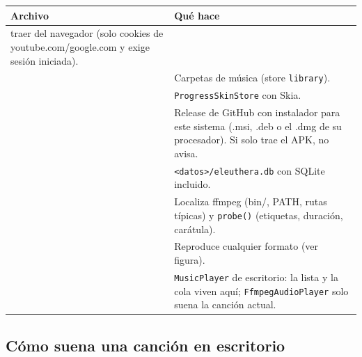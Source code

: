 \documentclass[11pt,a4paper,oneside]{report}
\newcommand{\ruta}[1]{{\small\path{#1}}}
\newcommand{\cod}[1]{\texttt{\small #1}}
\newenvironment{archivos}{%
  \small
  \begin{longtable}{>{\raggedright\arraybackslash}p{5.3cm} >{\raggedright\arraybackslash}p{10.6cm}}
  \toprule
  \textbf{Archivo} & \textbf{Qué hace} \\ \midrule \endhead
  \bottomrule \endfoot
}{\end{longtable}}
\begin{document}
\begin{archivos}
    traer del navegador (solo cookies de youtube.com/google.com y exige sesión iniciada). \\
  \ruta{data/settings/DesktopLibrarySettings.kt} & Carpetas de música (store \cod{library}). \\
  \ruta{data/settings/DesktopProgressSkinStore.kt} & \cod{ProgressSkinStore} con Skia. \\
  \ruta{data/update/DesktopUpdateChecker.kt} & Release de GitHub con instalador para este
    sistema (.msi, .deb o el .dmg de su procesador). Si solo trae el APK, no avisa. \\
  \ruta{data/db/AppDatabase.desktop.kt} & \cod{<datos>/eleuthera.db} con SQLite incluido. \\
  \ruta{playback/Ffmpeg.kt} & Localiza ffmpeg (bin/, PATH, rutas típicas) y \cod{probe()}
    (etiquetas, duración, carátula). \\
  \ruta{playback/FfmpegAudioPlayer.kt} & Reproduce cualquier formato (ver figura). \\
  \ruta{playback/DesktopPlayerController.kt} & \cod{MusicPlayer} de escritorio: la lista y la
    cola viven aquí; \cod{FfmpegAudioPlayer} solo suena la canción actual. \\
\end{archivos}

\subsection*{Cómo suena una canción en escritorio}

\begin{center}
\end{center}
\end{document}
